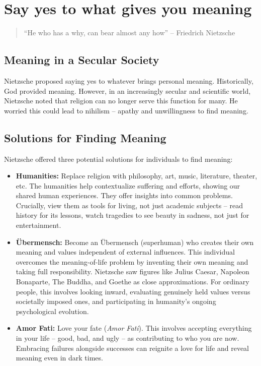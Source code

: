 \section{Say yes to what gives you meaning}

\begin{quote}
    “He who has a why, can bear almost any how” -- Friedrich Nietzsche
\end{quote}

\subsection*{Meaning in a Secular Society}
Nietzsche proposed saying yes to whatever brings personal meaning. Historically, God provided meaning. However, in an increasingly secular and scientific world, Nietzsche noted that religion can no longer serve this function for many. He worried this could lead to nihilism – apathy and unwillingness to find meaning.

\subsection*{Solutions for Finding Meaning}
Nietzsche offered three potential solutions for individuals to find meaning:
\begin{itemize}
    \item \textbf{Humanities:} Replace religion with philosophy, art, music, literature, theater, etc. The humanities help contextualize suffering and efforts, showing our shared human experiences. They offer insights into common problems. Crucially, view them as tools for living, not just academic subjects – read history for its lessons, watch tragedies to see beauty in sadness, not just for entertainment.
    \item \textbf{Übermensch:} Become an Übermensch (superhuman) who creates their own meaning and values independent of external influences. This individual overcomes the meaning-of-life problem by inventing their own meaning and taking full responsibility. Nietzsche saw figures like Julius Caesar, Napoleon Bonaparte, The Buddha, and Goethe as close approximations. For ordinary people, this involves looking inward, evaluating genuinely held values versus societally imposed ones, and participating in humanity's ongoing psychological evolution.
    \item \textbf{Amor Fati:} Love your fate (\textit{Amor Fati}). This involves accepting everything in your life – good, bad, and ugly – as contributing to who you are now. Embracing failures alongside successes can reignite a love for life and reveal meaning even in dark times.
\end{itemize}

